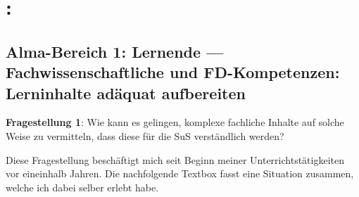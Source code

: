
\fancyfootoffset{0pt}%

\section{\thesubject: \thetopic\\\normalsize
\mainauthor}

\subsection{Alma-Bereich 1: Lernende --- Fachwissenschaftliche und FD-Kompetenzen: Lerninhalte adäquat aufbereiten}

\textbf{Fragestellung 1}: Wie kann es gelingen, komplexe fachliche Inhalte auf solche Weise zu vermitteln, dass diese für die SuS verständlich werden?

Diese Fragestellung beschäftigt mich seit Beginn meiner Unterrichtstätigkeiten vor eineinhalb Jahren. Die nachfolgende Textbox fasst eine Situation zusammen, welche ich dabei selber erlebt habe.

